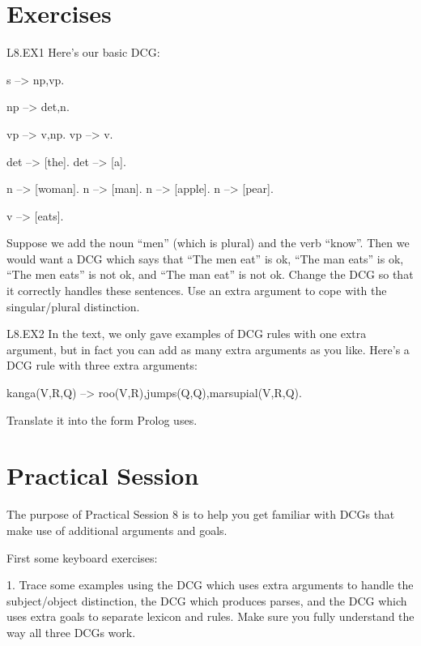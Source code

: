 \section{Exercises}\label{SEC.L8.EXERCISES}

\begin{LPNexercise}{L8.EX1} Here's our basic DCG:
\begin{LPNcodedisplay}
s --> np,vp.

np --> det,n.

vp --> v,np.
vp --> v.

det --> [the].
det --> [a].

n --> [woman].
n --> [man].
n --> [apple].
n --> [pear].

v --> [eats].
\end{LPNcodedisplay}


Suppose we add the noun ``men'' (which is plural) and the verb
``know''.  Then we would want a DCG which says that ``The men eat''
is ok, ``The man eats'' is ok, ``The men eats'' is not ok, and
``The man eat'' is not ok. Change the DCG so that it correctly
handles these sentences. Use an extra argument to cope with the
singular/plural distinction.
\end{LPNexercise}



\begin{LPNexercise}{L8.EX2}
In the text, we only gave examples of DCG rules
with one extra argument, but in fact you can add as many extra
arguments as you like. Here's a DCG rule
with three extra arguments:
\begin{LPNcodedisplay}
kanga(V,R,Q) --> roo(V,R),jumps(Q,Q),{marsupial(V,R,Q)}.
\end{LPNcodedisplay}
Translate it into the form Prolog uses.
\end{LPNexercise}

\section{Practical Session}\label{SEC.L8.PRAXIS}



The purpose of Practical Session 8 is to help you get familiar with
DCGs that make use of additional arguments and goals.

First some keyboard exercises:

1. Trace some examples using the DCG which uses extra arguments to
handle the subject/object distinction, the DCG which produces parses, and
the DCG which uses extra goals to separate lexicon and rules. Make sure
you fully understand the way all three DCGs work.

